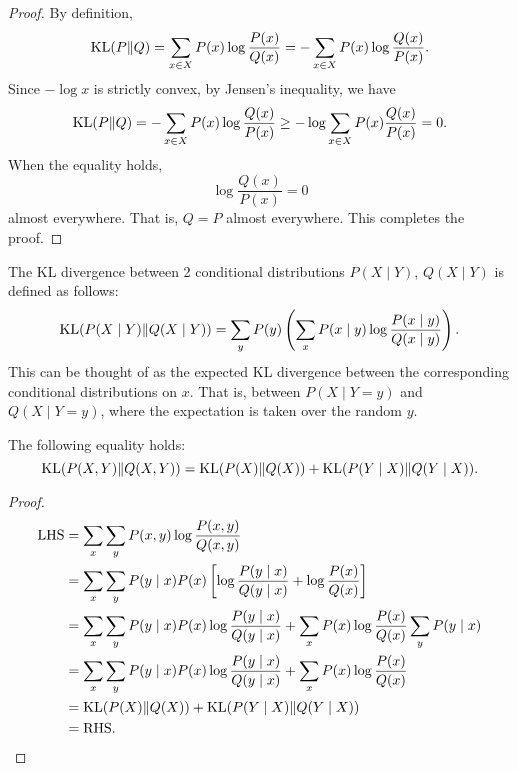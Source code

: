 \documentclass[a4paper]{article}
\begin{document}
\begin{proof}
  By definition,
  \[
    \operatorname{KL}(P \Vert Q) = \sum_{x \in X} P(x) \log \frac{P(x)}{Q(x)} = - \sum_{x \in X} P(x) \log \frac{Q(x)}{P(x)}.
  \] 
  Since $-\log x$ is strictly convex, by Jensen's inequality, we have
  \[
  \begin{aligned}
    \operatorname{KL}(P \Vert Q) = - \sum_{x \in X} P(x) \log \frac{Q(x)}{P(x)}
    \geq -\log \sum_{x \in X} P(x) \frac{Q(x)}{P(x)} = 0.
  \end{aligned}
  \]
  When the equality holds, 
  \[
  \log \frac{Q(x)}{P(x)} = 0
  \]
  almost everywhere. 
  That is, $Q = P$ almost everywhere. 
  This completes the proof.
\end{proof}

\begin{defi}
  The KL divergence between 2 conditional distributions 
  $P(X \mid Y)$, $Q(X \mid Y)$ is defined as follows:
  \[
  \operatorname{KL}({P(X \mid Y)} \Vert {Q(X \mid Y)}) = \sum_y P(y) 
  \left( \sum_x P(x \mid y) \log 
  \frac{P(x \mid y)}{Q(x \mid y)} \right).
  \]
  This can be thought of as the expected KL divergence 
  between the corresponding conditional distributions on 
  $x$. That is, between $P(X \mid Y = y)$ and $Q(X \mid Y = y)$, 
  where the expectation is taken over the random $y$.
\end{defi}

\begin{thm}
The following equality holds:
\[
\operatorname{KL}({P(X, Y)} \Vert {Q(X, Y)}) = 
\operatorname{KL}({P(X)} \Vert {Q(X)}) + \operatorname{KL}({P(Y \mid X)} 
\Vert {Q(Y \mid X)}).
\]
\end{thm}

\begin{proof}
\[
\begin{aligned}
  \text{LHS} &= \sum_x \sum_y P(x,y) \log \frac{P(x,y)}{Q(x,y)} \\
  &= \sum_x \sum_y P(y \mid x) P(x) \left[ \log 
  \frac{P(y \mid x)}{Q(y \mid x)} + \log \frac{P(x)}{Q(x)} \right] \\
  &= \sum_x \sum_y P(y \mid x) P(x) \log 
  \frac{P(y \mid x)}{Q(y \mid x)} + \sum_x P(x) \log 
  \frac{P(x)}{Q(x)} \sum_y P(y \mid x) \\
  &= \sum_x \sum_y P(y \mid x) P(x) \log \frac{P(y \mid x)}
  {Q(y \mid x)} + \sum_x P(x) \log \frac{P(x)}{Q(x)} \\
  &= \operatorname{KL}({P(X)} \Vert {Q(X)}) + \operatorname{KL}({P(Y \mid X)} \Vert {Q(Y \mid X)}) \\
  &= \text{RHS}.
\end{aligned}
\]
\end{proof}
\end{document}
